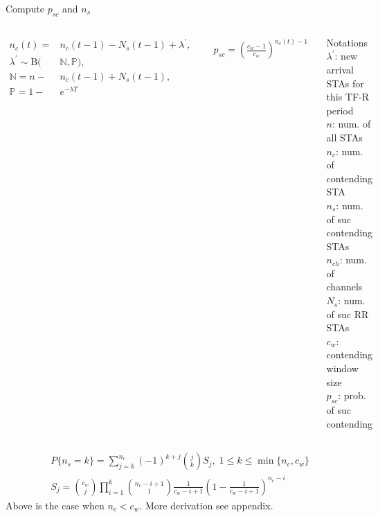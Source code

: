 \documentclass[10pt]{beamer}
\begin{document}
\begin{frame}{Compute $p_{sc}$ and $n_{s}$}
  \begin{columns}[T,onlytextwidth]
	\begin{align}
	n_c (t) = &n_c(t-1)- N_s(t-1) + \lambda^\prime,  \\
	\lambda^\prime \sim \mathrm{B} (&\mathbb{N,P}), \nonumber\\
	\mathbb{N} = n-&n_c(t-1)+N_s(t-1), \nonumber \\
	\mathbb{P} = 1-&e^{-\lambda T} \nonumber
	\end{align}
	
	\begin{align}
		p_{sc} =  (\frac{c_w-1}{c_w})^{n_c (t)-1} 	
	\end{align}
	\begin{alertblock}{Notations}
		$\lambda^\prime$: new arrival STAs for this TF-R period \\
		$n$: num. of all STAs \\
		$n_c$: num. of contending STA\\
    		$n_s$: num. of suc contending STAs \\
    		$n_{ch}$: num. of channels\\
    		$N_s$: num. of suc RR STAs \\
		$c_w$: contending window size\\
    		$p_{sc}$: prob. of suc contending    
	\end{alertblock}
    	\end{columns}
     
	\begin{align}
		P\lbrace n_s = k \rbrace  = \sum_{j=k}^{n_c}  (-1)^{k+j}\binom{j}{k}S_j, \; 1\leq k \leq \min\lbrace n_c,c_w \rbrace\\	
		S_j = \binom {c_w}{j} \prod_{i=1}^k \binom{n_c-i+1}{1}\frac{1}{c_w-i+1} (1-\frac{1}{c_w-i+1})^{n_c-i} \nonumber
	\end{align}	
	Above is the case when $n_c < c_w$. More derivation see appendix.
\end{frame}
\end{document}
